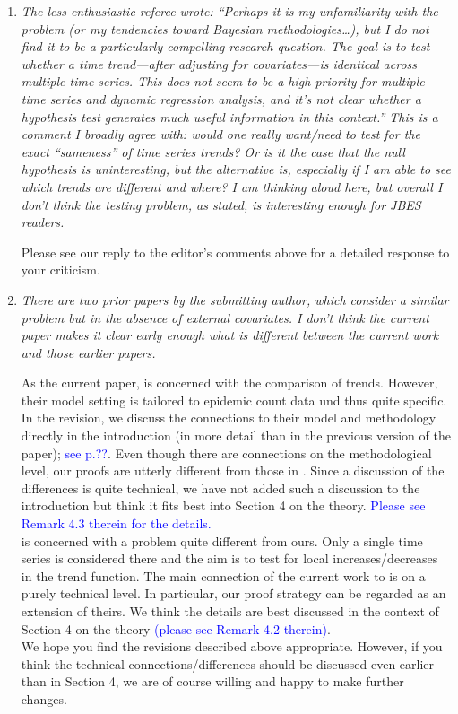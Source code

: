 \documentclass[a4paper,12pt]{article}
\begin{document}
\begin{enumerate}[label=\arabic*.,leftmargin=0.6cm]


\item \textit{The less enthusiastic referee wrote: “Perhaps it is my unfamiliarity with the problem (or my tendencies toward Bayesian methodologies…), but I do not find it to be a particularly compelling research question. The goal is to test whether a time trend—after adjusting for covariates—is identical across multiple time series. This does not seem to be a high priority for multiple time series and dynamic regression analysis, and it’s not clear whether a hypothesis test generates much useful information in this context.” This is a comment I broadly agree with: would one really want/need to test for the exact “sameness” of time series trends? Or is it the case that the null hypothesis is uninteresting, but the alternative is, especially if I am able to see which trends are different and where? I am thinking aloud here, but overall I don’t think the testing problem, as stated, is interesting enough for JBES readers.}

Please see our reply to the editor's comments above for a detailed response to your criticism. 
  

\item \textit{There are two prior papers by the submitting author, which consider a similar problem but in the absence of external covariates. I don’t think the current paper makes it clear early enough what is different between the current work and those earlier papers.}  

As the current paper, \cite{KhismatullinaVogt2023} is concerned with the comparison of trends. However, their model setting is tailored to epidemic count data und thus quite specific. In the revision, we discuss the connections to their model and methodology directly in the introduction (in more detail than in the previous version of the paper); \textcolor{blue}{see p.??}. Even though there are connections on the methodological level, our proofs are utterly different from those in \cite{KhismatullinaVogt2023}. Since a discussion of the differences is quite technical, we have not added such a discussion to the introduction but think it fits best into Section 4 on the theory. \textcolor{blue}{Please see Remark 4.3 therein for the details.} \\
\cite{KhismatullinaVogt2020} is concerned with a problem quite different from ours. Only a single time series is considered there and the aim is to test for local increases/decreases in the trend function. The main connection of the current work to \cite{KhismatullinaVogt2020} is on a purely technical level. In particular, our proof strategy can be regarded as an extension of theirs. We think the details are best discussed in the context of Section 4 on the theory \textcolor{blue}{(please see Remark 4.2 therein)}. \\
We hope you find the revisions described above appropriate. However, if you think the technical connections/differences should be discussed even earlier than in Section 4, we are of course willing and happy to make  further changes.  



\end{enumerate}
\end{document}
